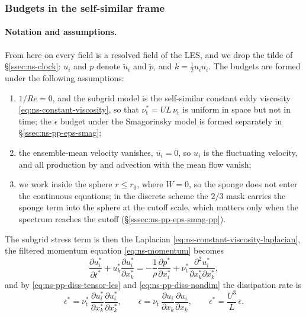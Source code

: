 \documentclass{article}
\begin{document}
\subsubsection{Budgets in the self-similar frame}\label{sssec:ns-pp-budgets}
\paragraph{Notation and assumptions.}
From here on every field is a resolved field of the LES, and we drop the
tilde of \S\ref{ssec:ns-clock}: $u_i$ and $p$ denote $\tilde u_i$ and
$\tilde p$, and $k = \tfrac12 u_i u_i$. The budgets are formed under the
following assumptions:
\begin{enumerate}
  \item $1/Re = 0$, and the subgrid model is the self-similar constant eddy
  viscosity \eqref{eq:ns-constant-viscosity}, so that
  $\nu_{\mathrm{t}}^* = UL\, \nu_{\mathrm{t}}$ is uniform in space but not in
  time; the $\epsilon$ budget under the Smagorinsky model is formed
  separately in \S\ref{ssec:ns-pp-eps-smag};
  \item the ensemble-mean velocity vanishes, $\overline{u_i} = 0$, so $u_i$ is
  the fluctuating velocity, and all production by and advection with the mean
  flow vanish;
  \item we work inside the sphere $r \le r_0$, where $W = 0$, so the sponge
  does not enter the continuous equations; in the discrete scheme the $2/3$
  mask carries the sponge term into the sphere at the cutoff scale, which
  matters only when the spectrum reaches the cutoff
  (\S\ref{sssec:ns-pp-eps-smag-pp}).
\end{enumerate}
The subgrid stress term is then the Laplacian
\eqref{eq:ns-constant-viscosity-laplacian}, the filtered momentum equation
\eqref{eq:ns-momentum} becomes
\begin{equation}\label{eq:ns-pp-rs-momentum}
  \frac{\partial u_i^*}{\partial t^*}
  + u_k^* \frac{\partial u_i^*}{\partial x_k^*}
  = -\frac{1}{\rho}\frac{\partial p^*}{\partial x_i^*}
  + \nu_{\mathrm{t}}^* \frac{\partial^2 u_i^*}{\partial x_k^* \partial x_k^*} ,
\end{equation}
and by \eqref{eq:ns-pp-diss-tensor-les} and \eqref{eq:ns-pp-diss-nondim} the
dissipation rate is
\begin{equation}\label{eq:ns-pp-eps-def}
  \epsilon^* = \nu_{\mathrm{t}}^*\, \frac{\partial u_i^*}{\partial x_k^*} \frac{\partial u_i^*}{\partial x_k^*} ,
  \qquad
  \epsilon = \nu_{\mathrm{t}}\, \frac{\partial u_i}{\partial x_k} \frac{\partial u_i}{\partial x_k} ,
  \qquad
  \epsilon^* = \frac{U^3}{L}\, \epsilon .
\end{equation}
\end{document}
